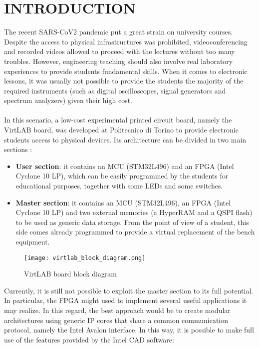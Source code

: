 \documentclass[10pt, english, a4paper, titlepage, oneside]{book}
\begin{document}
\chapter{INTRODUCTION}
\noindent The recent SARS-CoV2 pandemic put a great strain on university courses. Despite the access to physical infrastructures was prohibited, videoconferencing and recorded videos allowed to proceed with the lectures without too many troubles. However, engineering teaching should also involve real laboratory experiences to provide students fundamental skills. When it comes to electronic lessons, it was usually not possible to provide the students the majority of the required instruments (such as digital oscilloscopes, signal generators and spectrum analyzers) given their high cost.  \\ \\ 
In this scenario, a low-cost experimental printed circuit board, namely the VirtLAB board, was developed at Politecnico di Torino to provide electronic students access to physical devices. Its architecture can be divided in two main sections \cite{virtlab}:
\vspace{2mm}
\begin{itemize}
    \item \textbf{User section}: it contains an \acrshort{MCU} (STM32L496) and an \acrshort{FPGA} (Intel Cyclone 10 LP), which can be easily programmed by the students for educational purposes, together with some LEDs and some switches.
    \vspace{1mm}
    \item \textbf{Master section}: it contains an MCU (STM32L496), an FPGA (Intel Cyclone 10 LP) and two external memories (a Hyper\acrshort{RAM} and a QSPI flash) to be used as generic data storage. From the point of view of a student, this side comes already programmed to provide a virtual replacement of the bench equipment.
\end{itemize} 
\vspace{3mm}
\begin{figure}[H]
    \centering
    \texttt{[image: virtlab\_block\_diagram.png]}
    \vspace{5mm}
    \caption{VirtLAB board block diagram}
    \label{virtlab_block_diagram}
\end{figure}
\vspace{5mm}
Currently, it is still not possible to exploit the master section to its full potential. In particular, the FPGA might used to implement several useful applications it may realize. In this regard, the best approach would be to create modular architectures using generic \acrshort{IP} cores that share a common communication protocol, namely the Intel Avalon interface. In this way, it is possible to make full use of the features provided by the Intel CAD software:
\end{document}
